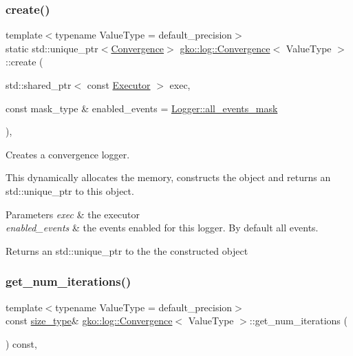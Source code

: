 \subsubsection{\texorpdfstring{create()}{create()}}
{\footnotesize\ttfamily template$<$typename Value\+Type  = default\+\_\+precision$>$ \\
static std\+::unique\+\_\+ptr$<$\hyperlink{classgko_1_1log_1_1Convergence}{Convergence}$>$ \hyperlink{classgko_1_1log_1_1Convergence}{gko\+::log\+::\+Convergence}$<$ Value\+Type $>$\+::create (\begin{DoxyParamCaption}\item[{std\+::shared\+\_\+ptr$<$ const \hyperlink{classgko_1_1Executor}{Executor} $>$}]{exec,  }\item[{const mask\+\_\+type \&}]{enabled\+\_\+events = {\ttfamily \hyperlink{classgko_1_1log_1_1Logger_a02534863a2d2f92dfeb2c39038365532}{Logger\+::all\+\_\+events\+\_\+mask}} }\end{DoxyParamCaption})\hspace{0.3cm}{\ttfamily [inline]}, {\ttfamily [static]}}



Creates a convergence logger. 

This dynamically allocates the memory, constructs the object and returns an std\+::unique\+\_\+ptr to this object.


\begin{DoxyParams}{Parameters}
{\em exec} & the executor \\
\hline
{\em enabled\+\_\+events} & the events enabled for this logger. By default all events.\\
\hline
\end{DoxyParams}
\begin{DoxyReturn}{Returns}
an std\+::unique\+\_\+ptr to the the constructed object 
\end{DoxyReturn}
\mbox{\label{classgko_1_1log_1_1Convergence_ae4f2ae84d87df2bffa814f51a8f09793}} 
\subsubsection{\texorpdfstring{get\+\_\+num\+\_\+iterations()}{get\_num\_iterations()}}
{\footnotesize\ttfamily template$<$typename Value\+Type  = default\+\_\+precision$>$ \\
const \hyperlink{namespacegko_a6e5c95df0ae4e47aab2f604a22d98ee7}{size\+\_\+type}\& \hyperlink{classgko_1_1log_1_1Convergence}{gko\+::log\+::\+Convergence}$<$ Value\+Type $>$\+::get\+\_\+num\+\_\+iterations (\begin{DoxyParamCaption}{ }\end{DoxyParamCaption}) const\hspace{0.3cm}{\ttfamily [inline]}, {\ttfamily [noexcept]}}



